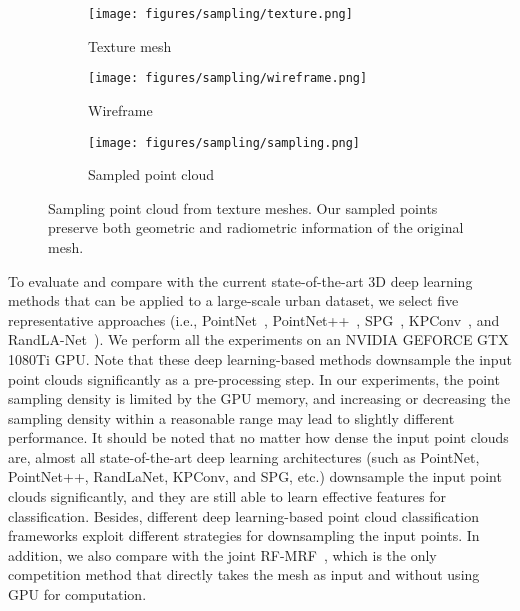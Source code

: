 \begin{figure}[!tb]
	\centering
	\begin{subfigure}[t]{0.32\textwidth}
		\texttt{[image: figures/sampling/texture.png]}
		\caption{Texture mesh}
	\end{subfigure}
	\hspace*{\fill}
	\begin{subfigure}[t]{0.32\textwidth}
		\texttt{[image: figures/sampling/wireframe.png]}
		\caption{Wireframe}
	\end{subfigure}
	\hspace*{\fill}
	\begin{subfigure}[t]{0.32\textwidth}
		\texttt{[image: figures/sampling/sampling.png]}
		\caption{Sampled point cloud}
	\end{subfigure}
	\caption{Sampling point cloud from texture meshes. Our sampled points preserve both geometric and radiometric information of the original mesh.} 
	\label{fig:samplingpts}
\end{figure}

To evaluate and compare with the current state-of-the-art 3D deep learning methods that can be applied to a large-scale urban dataset, we select five representative approaches (i.e., PointNet~\citep{qi2017pointnet}, PointNet++~\citep{qi2017pointnet++}, SPG~\citep{landrieu2018large}, KPConv~\citep{thomas2019kpconv}, and RandLA-Net~\citep{hu2020randla}). 
We perform all the experiments on an NVIDIA GEFORCE GTX 1080Ti GPU.
Note that these deep learning-based methods downsample the input point clouds significantly as a pre-processing step. 
In our experiments, the point sampling density is limited by the GPU memory, and increasing or decreasing the sampling density within a reasonable range may lead to slightly different performance.
\textcolor{ao}{
It should be noted that no matter how dense the input point clouds are, almost all state-of-the-art deep learning architectures (such as PointNet, PointNet++, RandLaNet, KPConv, and SPG, etc.) downsample the input point clouds significantly, and they are still able to learn effective features for classification. 
Besides, different deep learning-based point cloud classification frameworks exploit different strategies for downsampling the input points.
}
In addition, we also compare with the joint RF-MRF~\citep{Rouhani2017}, which is the only competition method that directly takes the mesh as input and without using GPU for computation.


